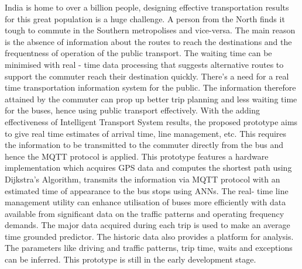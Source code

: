 India is home to over a billion people, designing effective transportation results for this great population is a huge challenge. A person from the North finds it tough to commute in the Southern metropolises and vice-versa. The main reason is the absence of information about the routes to reach the destinations and the frequentness of operation of the public transport. The waiting time can be minimised with real - time data processing that suggests alternative routes to support the commuter reach their destination quickly. There's a need for a real time transportation information system for the public. The information therefore attained by the commuter can prop up better trip planning and less waiting time for the buses, hence using public transport effectively. With the adding effectiveness of Intelligent Transport System results, the proposed prototype aims to give real time estimates of arrival time, line management, etc. This requires the information to be transmitted to the commuter directly from the bus and hence the MQTT protocol is applied. This prototype features a hardware implementation which acquires GPS data and computes the shortest path using Dijkstra’s Algorithm, transmits the information via MQTT protocol with an estimated time of appearance to the bus stops using ANNs. The real- time line management utility can enhance utilisation of buses more efficiently with data available from significant data on the traffic patterns and operating frequency demands. The major data acquired during each trip is used to make an average time grounded predictor. The historic data also provides a platform for analysis. The parameters like driving and traffic patterns, trip time, waits and exceptions can be inferred. This prototype is still in the early development stage.


